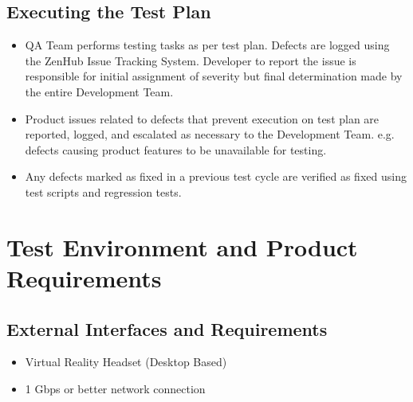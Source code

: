 \documentclass[letterpaper,10pt,english]{sphinxmanual}
\begin{document}
\section{Executing the Test Plan}
\label{\detokenize{test_plan/test_management:executing-the-test-plan}}\begin{itemize}
\item {} 
QA Team performs testing tasks as per test plan. Defects are logged using the ZenHub Issue Tracking System. Developer to report the issue is responsible for initial assignment of severity but final determination made by the entire Development Team.

\item {} 
Product issues related to defects that prevent execution on test plan are reported, logged, and escalated as necessary to the Development Team. e.g. defects causing product features to be unavailable for testing.

\item {} 
Any defects marked as fixed in a previous test cycle are verified as fixed using test scripts and regression tests.

\end{itemize}


\chapter{Test Environment and Product Requirements}
\label{\detokenize{test_plan/test_environment_and_product_requirements:test-environment-and-product-requirements}}\label{\detokenize{test_plan/test_environment_and_product_requirements::doc}}

\section{External Interfaces and Requirements}
\label{\detokenize{test_plan/test_environment_and_product_requirements:external-interfaces-and-requirements}}\begin{itemize}
\item {} 
Virtual Reality Headset (Desktop Based)

\item {} 
1 Gbps or better network connection

\end{itemize}
\end{document}
